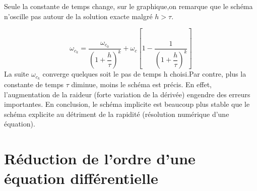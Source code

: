 \documentclass[10pt]{article}
\begin{document}
Seule la constante de temps change, sur le graphique,on remarque que le schéma n’oscille pas autour de la solution exacte malgré $h>\tau$.


$$\omega_{c_k}=\dfrac{\omega_{c_0}}{\left(1+\dfrac{h}{\tau}\right)^k} +\omega_c\left[1-\dfrac{1}{\left(1+\dfrac{h}{\tau}\right)^k}\right]$$
La suite $\omega_{c_k}$ converge quelques soit le pas de temps h choisi.Par contre, plus la constante de temps $\tau$ diminue, moins le schéma est précis. En effet, l’augmentation de la raideur (forte variation de la dérivée) engendre des erreurs importantes.
En conclusion, le schéma implicite est beaucoup plus stable que le schéma explicite au détriment de la rapidité (résolution numérique d’une équation).

\section{Réduction de l'ordre d'une équation différentielle}
\end{document}

